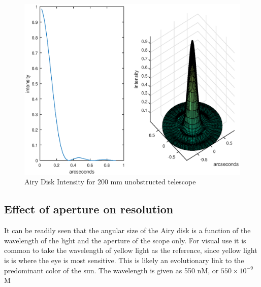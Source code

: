 \documentclass[11pt]{article}
\begin{document}
\begin{figure}[htb]
	\begin{center}
		\includegraphics[scale=0.8]{airy_bessel.eps}
		\caption{Airy Disk Intensity for 200 mm unobstructed telescope}
		\label{fig:airyplots}
	\end{center}
\end{figure}
\newpage

\subsection{Effect of aperture on resolution}

It can be readily seen that the angular size of the Airy disk is a function of the wavelength of the light and the aperture of the scope only.  For visual use it is common to take the wavelength of yellow light as the reference, since yellow light is is where the eye is most sensitive.  This is likely an evolutionary link to the predominant color of the sun.  The wavelength is given as 550 nM, or $550\times 10^{-9}$ M 
\end{document}
